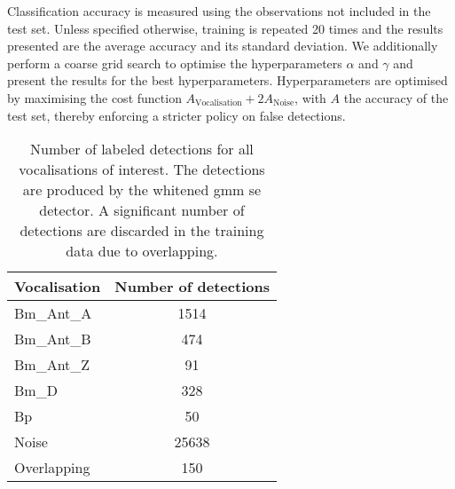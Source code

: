 {Classification accuracy is measured using the observations not included in the test set. Unless specified otherwise, training is repeated 20 times and the results presented are the average accuracy and its standard deviation. We additionally perform a coarse grid search to optimise the hyperparameters $\alpha$ and $\gamma$ and present the results for the best hyperparameters. Hyperparameters are optimised by maximising the cost function $A_\text{Vocalisation} + 2A_\text{Noise}$, with $A$ the accuracy of the test set, thereby enforcing a stricter policy on false detections.




\begin{table}[h!]
\caption[Number of labeled detections for all vocalisations of interest.]{Number of labeled detections for all vocalisations of interest. The detections are produced by the whitened \ac{gmm} \ac{se} detector. A significant number of detections are discarded in the training data due to overlapping.}
\label{tab:numdetections}
\centering
\begin{tabular}{lc} 
\textbf{Vocalisation}      & \textbf{Number of detections}  \\ \hline
Bm\_Ant\_A & 1514              \\
Bm\_Ant\_B & 474              \\
Bm\_Ant\_Z & 91               \\
Bm\_D      & 328               \\
Bp & 50                \\
Noise      & 25638          \\
Overlapping & 150 \footnotemark[1]      \\ 
\end{tabular}
\end{table}


}
